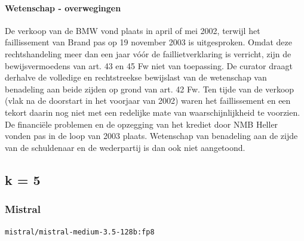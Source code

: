 \documentclass[
  dutch,
  a4paper,
]{article}
\begin{document}
\paragraph{Wetenschap - overwegingen}\label{wetenschap---overwegingen-56}

De verkoop van de BMW vond plaats in april of mei 2002, terwijl het faillissement van Brand pas op 19 november 2003 is uitgesproken. Omdat deze rechtshandeling meer dan een jaar vóór de faillietverklaring is verricht, zijn de bewijsvermoedens van art. 43 en 45 Fw niet van toepassing. De curator draagt derhalve de volledige en rechtstreekse bewijslast van de wetenschap van benadeling aan beide zijden op grond van art. 42 Fw. Ten tijde van de verkoop (vlak na de doorstart in het voorjaar van 2002) waren het faillissement en een tekort daarin nog niet met een redelijke mate van waarschijnlijkheid te voorzien. De financiële problemen en de opzegging van het krediet door NMB Heller vonden pas in de loop van 2003 plaats. Wetenschap van benadeling aan de zijde van de schuldenaar en de wederpartij is dan ook niet aangetoond.

\newpage


\subsection{k = 5}\label{k-5-6}

\subsubsection{Mistral}\label{mistral-19}

\texttt{mistral/mistral-medium-3.5-128b:fp8}
\end{document}
